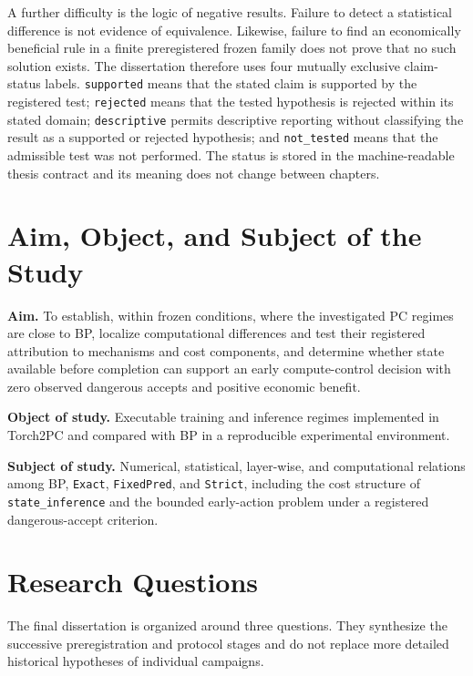 A further difficulty is the logic of negative results. Failure to detect a statistical
difference is not evidence of equivalence. Likewise, failure to find an economically
beneficial rule in a finite preregistered frozen family does not prove that no such
solution exists. The dissertation therefore uses four mutually exclusive claim-status
labels. \texttt{supported} means that the stated claim is supported by the registered
test; \texttt{rejected} means that the tested hypothesis is rejected within its stated
domain; \texttt{descriptive} permits descriptive reporting without classifying the
result as a supported or rejected hypothesis; and \texttt{not\_tested} means that the
admissible test was not performed. The status is stored in the machine-readable thesis
contract and its meaning does not change between chapters.

\section{Aim, Object, and Subject of the Study}

\textbf{Aim.} To establish, within frozen conditions, where the investigated PC
regimes are close to BP, localize computational differences and test their registered
attribution to mechanisms and cost components, and determine whether state available
before completion can support an early compute-control decision with zero observed
dangerous accepts and positive economic benefit.

\textbf{Object of study.} Executable training and inference regimes implemented in
Torch2PC and compared with BP in a reproducible experimental environment.

\textbf{Subject of study.} Numerical, statistical, layer-wise, and computational
relations among BP, \texttt{Exact}, \texttt{FixedPred}, and \texttt{Strict}, including
the cost structure of \texttt{state\_inference} and the bounded early-action problem
under a registered dangerous-accept criterion.

\section{Research Questions}
\label{sec:intro-rq-en}

The final dissertation is organized around three questions. They synthesize the
successive preregistration and protocol stages and do not replace more detailed
historical hypotheses of individual campaigns.

